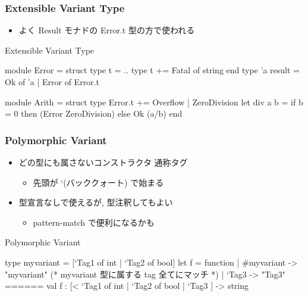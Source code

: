 \documentclass[dvipdfmx,14pt,notheorems,aspectratio=169]{beamer}
\theoremstyle{definition}
\begin{document}
    \begin{frame}[fragile]\frametitle{Extensible Variant Type}
        \begin{itemize}
            \item よく Result モナドの Error.t 型の方で使われる
        \end{itemize}
        \begin{exampleblock}{Extensible Variant Type}
            \scriptsize
            \begin{verbatimtab}
module Error = struct
    type t = ..
    type t += Fatal of string
end
type 'a result = Ok of 'a | Error of Error.t

module Arith = struct
    type Error.t += Overflow | ZeroDivision
    let div a b = if b = 0 then (Error ZeroDivision) else Ok (a/b)
end
\end{verbatimtab}
        \end{exampleblock}
    \end{frame}

    \begin{frame}[fragile]\frametitle{Polymorphic Variant}
        \begin{itemize}
            \item どの型にも属さないコンストラクタ 通称タグ
            \begin{itemize}
                \item 先頭が `(バッククォート) で始まる
            \end{itemize}
            \item 型宣言なしで使えるが, 型注釈してもよい
            \begin{itemize}
                \item pattern-match で便利になるかも
            \end{itemize}
        \end{itemize}
        \begin{exampleblock}{Polymorphic Variant}
            \scriptsize
            \begin{verbatimtab}
type myvariant = [`Tag1 of int | `Tag2 of bool]
let f = function
    | #myvariant -> "myvariant" (* myvariant 型に属する tag 全てにマッチ *)
    | `Tag3 -> "Tag3"
======
val f : [< `Tag1 of int | `Tag2 of bool | `Tag3 ] -> string
\end{verbatimtab}
        \end{exampleblock}
    \end{frame}
\end{document}
